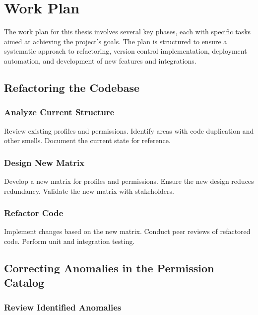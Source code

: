 %

\chapter{Work Plan}
\label{cha:Work Plan}




The work plan for this thesis involves several key phases, each with specific tasks aimed at achieving the project's goals. The plan is structured to ensure a systematic approach to refactoring, version control implementation, deployment automation, and development of new features and integrations.

\section{Refactoring the Codebase}

\subsection{Analyze Current Structure}

Review existing profiles and permissions.
Identify areas with code duplication and other smells.
Document the current state for reference.


\subsection{Design New Matrix}

Develop a new matrix for profiles and permissions.
Ensure the new design reduces redundancy.
Validate the new matrix with stakeholders.


\subsection{Refactor Code}

Implement changes based on the new matrix.
Conduct peer reviews of refactored code.
Perform unit and integration testing.


\section{Correcting Anomalies in the Permission Catalog}

\subsection{Review Identified Anomalies}

